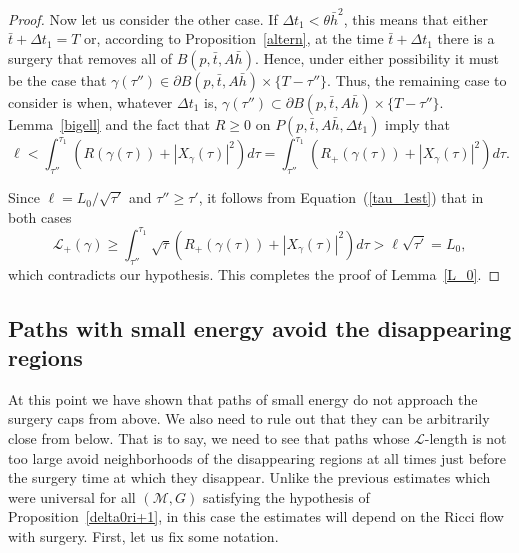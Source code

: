 \begin{proof}
Now let us consider the other case. If $\Delta t_1<\theta \bar h^2$,
this means that either $\bar t+\Delta t_1=T$ or, according to
Proposition~\ref{altern}, at the time $\bar t+\Delta t_1$ there is a
surgery that removes all of $B(p,\bar t,A\bar h)$. Hence, under
either possibility it must be the case that $\gamma(\tau'')\in
\partial B(p,\bar t,A\bar h)\times \{T-\tau''\}$. Thus, the remaining
case to consider is when, whatever $\Delta t_1$ is,
$\gamma(\tau'')\subset
\partial B(p,\bar t,A\bar h)\times \{T-\tau''\}$.
Lemma~\ref{bigell} and the fact that $R\ge 0$ on $P(p,\bar t,A\bar
h,\Delta t_1)$ imply that
$$\ell<\int_{\tau''}^{\tau_1}\left(R(\gamma(\tau))+|X_\gamma(\tau)|^2\right)d\tau =
\int_{\tau''}^{\tau_1}\left(R_+(\gamma(\tau))+|X_\gamma(\tau)|^2\right)d\tau.$$

Since $\ell=L_0/\sqrt{\tau'}$ and $\tau''\ge \tau'$, it follows from
Equation~(\ref{tau_1est}) that in both
cases
$${\mathcal L}_+(\gamma)\ge
\int_{\tau''}^{\tau_1}\sqrt{\tau}\left(R_+(\gamma(\tau))+|X_\gamma(\tau)|^2\right)d\tau>
\ell\sqrt{\tau'}=L_0,$$ which contradicts our hypothesis. This
completes the proof of Lemma~\ref{L_0}.
\end{proof}

\subsection{Paths with small energy avoid
 the disappearing regions}


At this point we have shown that paths of small energy do not approach
the surgery caps from above. We also need to rule out that they can be arbitrarily
close from below. That is to say,
 we need to see that paths whose ${\mathcal L}$-length is not
too large avoid neighborhoods of the disappearing regions at all
times just before the surgery time at which they disappear. Unlike
the previous estimates which were universal for all $({\mathcal
M},G)$ satisfying the hypothesis of Proposition~\ref{delta0ri+1}, in
this case the estimates will depend on the Ricci flow with surgery.
First, let us fix some notation.

